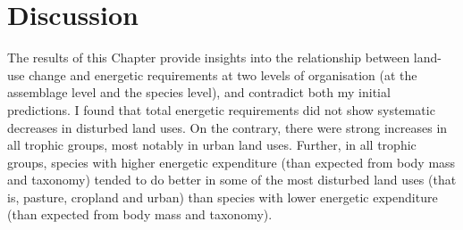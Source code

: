 \section{Discussion}

The results of this Chapter provide insights into the relationship between land-use change and energetic requirements at two levels of organisation (at the assemblage level and the species level), and contradict both my initial predictions. I found that total energetic requirements did not show systematic decreases in disturbed land uses. On the contrary, there were strong increases in all trophic groups, most notably in urban land uses. Further, in all trophic groups, species with higher energetic expenditure (than expected from body mass and taxonomy) tended to do better in some of the most disturbed land uses (that is, pasture, cropland and urban) than species with lower energetic expenditure (than expected from body mass and taxonomy).

